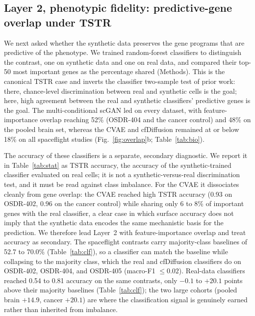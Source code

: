 \documentclass[11pt]{article}
\begin{document}
\subsection{Layer 2, phenotypic fidelity: predictive-gene overlap under TSTR}
We next asked whether the synthetic data preserves the gene programs that are predictive of the phenotype. We trained random-forest classifiers to distinguish the contrast, one on synthetic data and one on real data, and compared their top-50 most important genes as the percentage shared (Methods). This is the canonical TSTR case and inverts the classifier two-sample test of prior work: there, chance-level discrimination between real and synthetic cells is the goal; here, high agreement between the real and synthetic classifiers' predictive genes is the goal. The multi-conditional scGAN led on every dataset, with feature-importance overlap reaching 52\% (OSDR-404 and the cancer control) and 48\% on the pooled brain set, whereas the CVAE and cfDiffusion remained at or below 18\% on all spaceflight studies (Fig.~\ref{fig:overlap}b; Table~\ref{tab:bio}).

The accuracy of these classifiers is a separate, secondary diagnostic. We report it in Table~\ref{tab:stat} as TSTR accuracy, the accuracy of the synthetic-trained classifier evaluated on real cells; it is not a synthetic-versus-real discrimination test, and it must be read against class imbalance. For the CVAE it dissociates cleanly from gene overlap: the CVAE reached high TSTR accuracy (0.93 on OSDR-402, 0.96 on the cancer control) while sharing only 6 to 8\% of important genes with the real classifier, a clear case in which surface accuracy does not imply that the synthetic data encodes the same mechanistic basis for the prediction. We therefore lead Layer~2 with feature-importance overlap and treat accuracy as secondary. The spaceflight contrasts carry majority-class baselines of 52.7 to 70.0\% (Table~\ref{tab:clf}), so a classifier can match the baseline while collapsing to the majority class, which the real and cfDiffusion classifiers do on OSDR-402, OSDR-404, and OSDR-405 (macro-F1 $\le 0.02$). Real-data classifiers reached 0.54 to 0.81 accuracy on the same contrasts, only $-0.1$ to $+20.1$ points above their majority baselines (Table~\ref{tab:clf}); the two large cohorts (pooled brain $+14.9$, cancer $+20.1$) are where the classification signal is genuinely earned rather than inherited from imbalance.

\FloatBarrier
\end{document}
